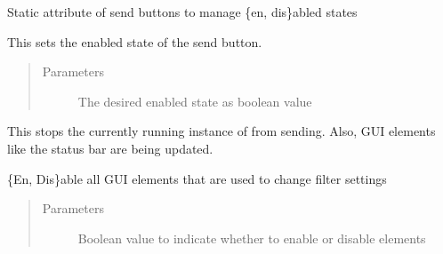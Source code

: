 \documentclass[letterpaper,10pt,english]{sphinxmanual}
\begin{document}
\begin{fulllineitems}
\begin{fulllineitems}
\end{fulllineitems}


\begin{fulllineitems}
\label{\detokenize{src:src.SenderTabElement.SenderTabElement.sendButtonList}}
Static attribute of send buttons to manage \{en, dis\}abled states

\end{fulllineitems}


\begin{fulllineitems}
\label{\detokenize{src:src.SenderTabElement.SenderTabElement.setSendButtonState}}
This sets the enabled state of the send button.
\begin{quote}\begin{description}
\item[{Parameters}] \leavevmode
{} \textendash{} The desired enabled state as boolean value

\end{description}\end{quote}

\end{fulllineitems}


\begin{fulllineitems}
\label{\detokenize{src:src.SenderTabElement.SenderTabElement.stopSending}}
This stops the currently running instance of {\hyperref[\detokenize{src:src.SenderThread.LoopSenderThread}]{}} from sending.
Also, GUI elements like the status bar are being updated.

\end{fulllineitems}


\begin{fulllineitems}
\label{\detokenize{src:src.SenderTabElement.SenderTabElement.toggleGUIElements}}
\{En, Dis\}able all GUI elements that are used to change filter settings
\begin{quote}\begin{description}
\item[{Parameters}] \leavevmode
{} \textendash{} Boolean value to indicate whether to enable or disable elements


\end{description}
\end{quote}
\end{fulllineitems}
\end{fulllineitems}
\end{document}
